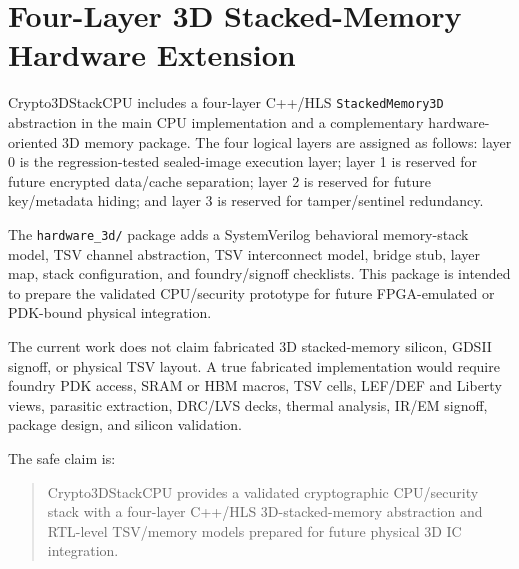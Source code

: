 \section{Four-Layer 3D Stacked-Memory Hardware Extension}

Crypto3DStackCPU includes a four-layer C++/HLS \texttt{StackedMemory3D} abstraction in the main CPU implementation and a complementary hardware-oriented 3D memory package. The four logical layers are assigned as follows: layer 0 is the regression-tested sealed-image execution layer; layer 1 is reserved for future encrypted data/cache separation; layer 2 is reserved for future key/metadata hiding; and layer 3 is reserved for tamper/sentinel redundancy.

The \texttt{hardware\_3d/} package adds a SystemVerilog behavioral memory-stack model, TSV channel abstraction, TSV interconnect model, bridge stub, layer map, stack configuration, and foundry/signoff checklists. This package is intended to prepare the validated CPU/security prototype for future FPGA-emulated or PDK-bound physical integration.

The current work does not claim fabricated 3D stacked-memory silicon, GDSII signoff, or physical TSV layout. A true fabricated implementation would require foundry PDK access, SRAM or HBM macros, TSV cells, LEF/DEF and Liberty views, parasitic extraction, DRC/LVS decks, thermal analysis, IR/EM signoff, package design, and silicon validation.

The safe claim is:

\begin{quote}
Crypto3DStackCPU provides a validated cryptographic CPU/security stack with a four-layer C++/HLS 3D-stacked-memory abstraction and RTL-level TSV/memory models prepared for future physical 3D IC integration.
\end{quote}
